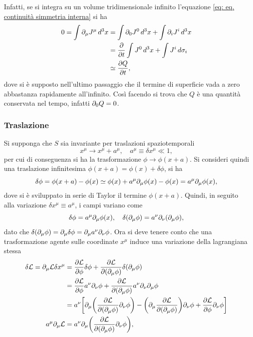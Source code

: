 Infatti, se si integra su un volume tridimensionale infinito l'equazione \eqref{eq: eq. continuità simmetria interna} si ha 
\begin{equation}
    \begin{split}
        0 = \int \partial_\mu J^\mu\,d^3x &= \int \partial_0 J^0\,d^3x + \int \partial_i J^i\,d^3x \\
        &= \frac{\partial}{\partial t}\int J^0\,d^3x + \int J^i\,d\sigma_i \\
        &\simeq\frac{\partial Q}{\partial t},
    \end{split}
\end{equation}
dove si è supposto nell'ultimo passaggio che il termine di superficie vada a zero abbastanza rapidamente all'infinito. Così facendo si trova che $Q$ è una quantità conservata nel tempo, infatti $\partial_0Q = 0$.

\subsubsection{Traslazione}
Si supponga che $S$ sia invariante per traslazioni spaziotemporali
\begin{equation}
    x^\mu\to x^\mu + a^\mu,\quad a^\mu \equiv \delta x^\mu\ll1,
\end{equation}
per cui di conseguenza si ha la trasformazione $\phi\to\phi(x+a)$. Si consideri quindi una traslazione infinitesima $\phi(x+a) = \phi(x) + \delta\phi$, si ha
\begin{equation}
    \delta\phi = \phi(x+a) -\phi(x) \simeq \phi(x) + a^\mu\partial_\mu\phi(x) - \phi(x) = a^\mu\partial_\mu\phi(x),
\end{equation}
dove si è sviluppato in serie di Taylor il termine $\phi(x+a)$. Quindi, in seguito alla variazione $\delta x^\mu \equiv a^\mu$, i campi variano come
\begin{equation}
    \delta\phi = a^\mu\partial_\mu\phi(x),\quad\delta(\partial_\mu\phi) = a^\nu\partial_\nu(\partial_\mu\phi),
\end{equation}
dato che $\delta(\partial_\mu\phi) = \partial_\mu\delta\phi = \partial_\mu a^\nu\partial_\nu\phi$. Ora si deve tenere conto che una trasformazione agente sulle coordinate $x^\mu$ induce una variazione della lagrangiana stessa
\begin{equation}
    \begin{split}
        \delta\mathcal{L} = \partial_\mu\mathcal{L}\delta x^\mu &= \frac{\partial\mathcal{L}}{\partial\phi}\delta\phi + \frac{\partial\mathcal{L}}{\partial(\partial_\mu\phi)}\delta(\partial_\mu\phi) \\
        &= \frac{\partial\mathcal{L}}{\partial\phi}a^\nu\partial_\nu\phi + \frac{\partial\mathcal{L}}{\partial(\partial_\mu\phi)}a^\nu\partial_\nu\partial_\mu\phi \\
        &= a^\nu\bigg[\partial_\mu\bigg(\frac{\partial\mathcal{L}}{\partial(\partial_\mu\phi)}\partial_\nu\phi\bigg) - \bigg(\partial_\mu\frac{\partial\mathcal{L}}{\partial(\partial_\mu\phi)}\bigg)\partial_\nu\phi + \frac{\partial\mathcal{L}}{\partial\phi}\partial_\nu\phi\bigg] \\
        a^\mu\partial_\mu\mathcal{L} &= a^\nu\partial_\mu\bigg(\frac{\partial\mathcal{L}}{\partial(\partial_\mu\phi)}\partial_\nu\phi\bigg),
    \end{split}
\end{equation}
